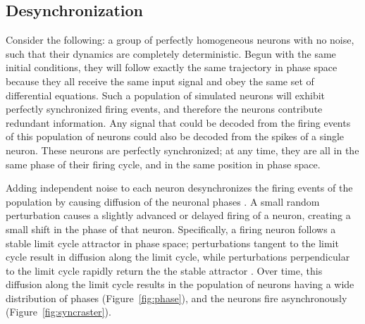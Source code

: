 \documentclass[letterpaper,11pt]{article}
\begin{document}
\subsection{Desynchronization}
\label{scn:desync}

Consider the following: a group of perfectly homogeneous neurons with no noise, such that their dynamics are completely deterministic. Begun with the same initial conditions, they will follow exactly the same trajectory in phase space because they all receive the same input signal and obey the same set of differential equations. Such a population of simulated neurons will exhibit perfectly synchronized firing events, and therefore the neurons contribute redundant information. Any signal that could be decoded from the firing events of this population of neurons could also be decoded from the spikes of a single neuron. These neurons are perfectly synchronized; at any time, they are all in the same phase of their firing cycle, and in the same position in phase space.

Adding independent noise to each neuron desynchronizes the firing events of the population by causing diffusion of the neuronal phases \citep{Stocks2001a}. A small random perturbation causes a slightly advanced or delayed firing of a neuron, creating a small shift in the phase of that neuron. Specifically, a firing neuron follows a stable limit cycle attractor in phase space; perturbations tangent to the limit cycle result in diffusion along the limit cycle, while perturbations perpendicular to the limit cycle rapidly return the the stable attractor \citep{Tomita1974}. Over time, this diffusion along the limit cycle results in the population of neurons having a wide distribution of phases (Figure~\ref{fig:phase}), and the neurons fire asynchronously (Figure~\ref{fig:syncraster}).
\end{document}
